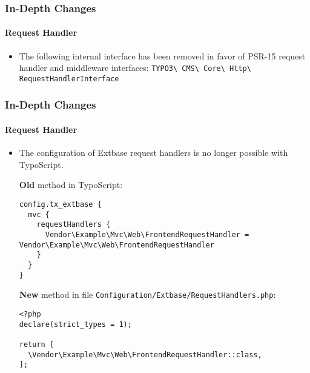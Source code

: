 
\begin{frame}[fragile]
	\frametitle{In-Depth Changes}
	\framesubtitle{Request Handler}

	\begin{itemize}
		\item The following internal interface has been removed
			in favor of PSR-15 request handler and middleware interfaces:\newline
			\texttt{TYPO3\textbackslash
				CMS\textbackslash
				Core\textbackslash
				Http\textbackslash
				RequestHandlerInterface}

	\end{itemize}

\end{frame}


\begin{frame}[fragile]
	\frametitle{In-Depth Changes}
	\framesubtitle{Request Handler}

	\lstset{basicstyle=\tiny\ttfamily}

	\begin{itemize}
		\item The configuration of Extbase request handlers is no longer possible with TypoScript.

		\smaller\textbf{Old} method in TypoScript:\normalsize
\begin{lstlisting}
config.tx_extbase {
  mvc {
    requestHandlers {
      Vendor\Example\Mvc\Web\FrontendRequestHandler = Vendor\Example\Mvc\Web\FrontendRequestHandler
    }
  }
}
\end{lstlisting}

		\smaller\textbf{New} method in file \texttt{Configuration/Extbase/RequestHandlers.php}:\normalsize
\begin{lstlisting}
<?php
declare(strict_types = 1);

return [
  \Vendor\Example\Mvc\Web\FrontendRequestHandler::class,
];
\end{lstlisting}

	\end{itemize}

\end{frame}

